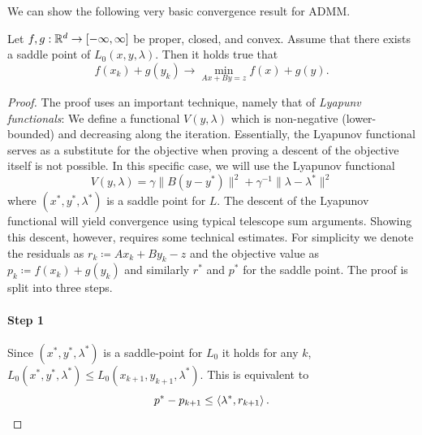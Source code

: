 We can show the following very basic convergence result for ADMM.
\begin{theorem}
    Let $f,g:\mathbb{R}^d\rightarrow [-\infty,\infty]$ be proper, closed, and convex. Assume that there exists a saddle point of $L_0(x,y,\lambda)$. Then it holds true that 
    \begin{equation}
        f(x_k)+g(y_k) \rightarrow \min_{Ax + By = z} f(x) + g(y).
    \end{equation}
\end{theorem}
\begin{proof}
    The proof uses an important technique, namely that of \emph{Lyapunv functionals}: We define a functional $V(y,\lambda)$ which is non-negative (lower-bounded) and decreasing along the iteration. Essentially, the Lyapunov functional serves as a substitute for the objective when proving a descent of the objective itself is not possible. In this specific case, we will use the Lyapunov functional 
    \begin{equation}
        V(y,\lambda) = \gamma \|B(y-y^*)\|^2 + \gamma^{-1} \|\lambda-\lambda^*\|^2
    \end{equation}
    where $(x^*,y^*,\lambda^*)$ is a saddle point for $L$. The descent of the Lyapunov functional will yield convergence using typical telescope sum arguments. Showing this descent, however, requires some technical estimates. For simplicity we denote the residuals as $r_k \coloneqq Ax_k + By_k- z$ and the objective value as $p_k \coloneqq f(x_k) + g(y_k)$ and similarly $r^*$ and $p^*$ for the saddle point. The proof is split into three steps.
    \paragraph{Step 1} 
    Since $(x^*,y^*,\lambda^*)$ is a saddle-point for $L_0$ it holds for any $k$, $L_0(x^*,y^*,\lambda^*)\leq L_0(x_{k+1},y_{k+1},\lambda^*)$. This is equivalent to
    \begin{equation}\label{duality:eq:proof_admm1}
        p^*-p_{k+1}\leq \left\langle\lambda^* , r_{k+1}\right\rangle.
    \end{equation}

\end{proof}
